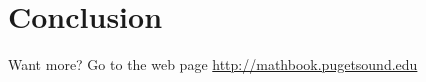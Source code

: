 \documentclass[11pt, oneside]{article}   	%
\begin{document}
%
%
%
%
%
%
%
%

\section{Conclusion}


Want more? Go to the web page \url{http://mathbook.pugetsound.edu}

	
\end{document}
